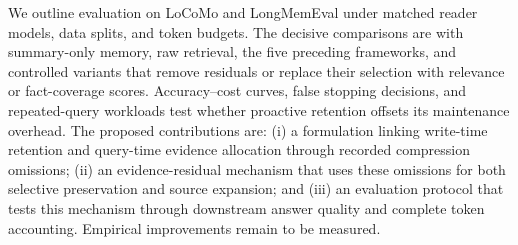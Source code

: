 \documentclass{article}
\begin{document}
We outline evaluation on LoCoMo and LongMemEval under matched reader models,
data splits, and token budgets. The decisive comparisons are with summary-only
memory, raw retrieval, the five preceding frameworks, and controlled variants
that remove residuals or replace their selection with relevance or fact-coverage
scores. Accuracy--cost curves, false stopping decisions, and repeated-query
workloads test whether proactive retention offsets its maintenance overhead.
The proposed contributions are: (i) a formulation linking write-time retention
and query-time evidence allocation through recorded compression omissions;
(ii) an evidence-residual mechanism that uses these omissions for both selective
preservation and source expansion; and (iii) an evaluation protocol that tests
this mechanism through downstream answer quality and complete token accounting.
Empirical improvements remain to be measured.



\end{document}
